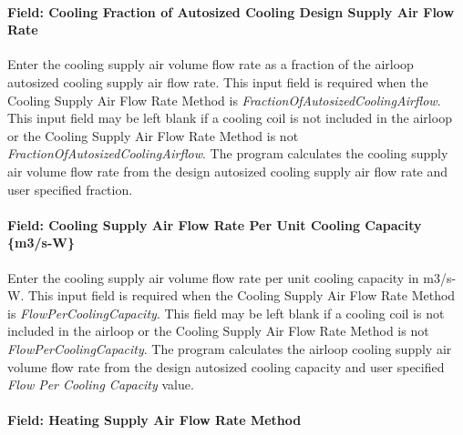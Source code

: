 \paragraph{Field: Cooling Fraction of Autosized Cooling Design Supply Air Flow Rate}\label{field-cooling-fraction-of-autosized-cooling-design-supply-air-flow-rate}

Enter the cooling supply air volume flow rate as a fraction of the airloop autosized cooling supply air flow rate. This input field is required when the Cooling Supply Air Flow Rate Method is \emph{FractionOfAutosizedCoolingAirflow}. This input field may be left blank if a cooling coil is not included in the airloop or the Cooling Supply Air Flow Rate Method is not \emph{FractionOfAutosizedCoolingAirflow}. The program calculates the cooling supply air volume flow rate from the design autosized cooling supply air flow rate and user specified fraction.

\paragraph{Field: Cooling Supply Air Flow Rate Per Unit Cooling Capacity \{m3/s-W\}}\label{field-cooling-supply-air-flow-rate-per-unit-cooling-capacity-m3s-w}

Enter the cooling supply air volume flow rate per unit cooling capacity in m3/s-W. This input field is required when the Cooling Supply Air Flow Rate Method is \emph{FlowPerCoolingCapacity}. This field may be left blank if a cooling coil is not included in the airloop or the Cooling Supply Air Flow Rate Method is not \emph{FlowPerCoolingCapacity}. The program calculates the airloop cooling supply air volume flow rate from the design autosized cooling capacity and user specified \emph{Flow Per Cooling Capacity} value.

\paragraph{Field: Heating Supply Air Flow Rate Method}\label{field-heating-supply-air-flow-rate-method}

